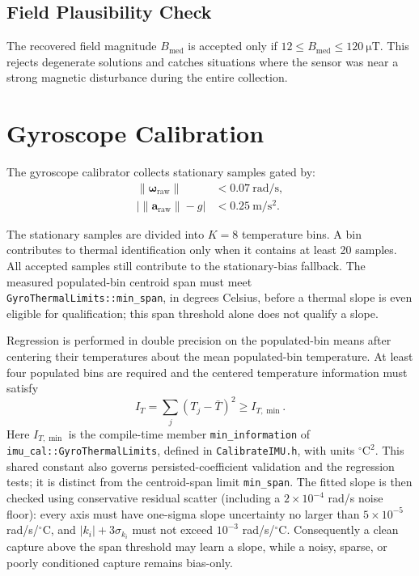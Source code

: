 \documentclass[conference]{IEEEtran}
\begin{document}
    \subsection{Field Plausibility Check}

    The recovered field magnitude $B_\text{med}$ is accepted only if
    $12 \le B_\text{med} \le \SI{120}{\micro\tesla}$.
    This rejects degenerate solutions and catches situations where
    the sensor was near a strong magnetic disturbance during the
    entire collection.

    \section{Gyroscope Calibration}
    \label{sec:gyro_fit}

    The gyroscope calibrator collects stationary samples gated by:
    \begin{align}
        \|\boldsymbol{\omega}_\text{raw}\| &< \SI{0.07}{\radian\per\second}, \\
        \bigl|\|\mathbf{a}_\text{raw}\| - g\bigr| &< \SI{0.25}{\meter\per\second\squared}.
    \end{align}

    The stationary samples are divided into $K=8$ temperature bins.  A bin
    contributes to thermal identification only when it contains at least 20
    samples.  All accepted samples still contribute to the stationary-bias
    fallback.  The measured populated-bin centroid span must meet
    \texttt{GyroThermalLimits::min\_span}, in degrees Celsius, before a
    thermal slope is even eligible for qualification; this span threshold
    alone does not qualify a slope.

    Regression is performed in double precision on the populated-bin means
    after centering their temperatures about the mean populated-bin
    temperature.  At least four populated bins are required and the centered
    temperature information must satisfy
    \begin{equation}
        I_T = \sum_j(T_j-\bar T)^2 \ge I_{T,\min}.
    \end{equation}
    Here $I_{T,\min}$ is the compile-time member \texttt{min\_information}
    of \texttt{imu\_cal::GyroThermalLimits}, defined in
    \texttt{CalibrateIMU.h}, with units ${}^\circ\mathrm{C}^2$.
    This shared constant also governs persisted-coefficient validation and
    the regression tests; it is distinct from the centroid-span limit
    \texttt{min\_span}.  The fitted slope is then checked using
    conservative residual scatter (including a $2\times10^{-4}$ rad/s noise
    floor): every axis must have one-sigma slope uncertainty no larger than
    $5\times10^{-5}$ rad/s/$^\circ$C, and
    $|k_i|+3\sigma_{k_i}$ must not exceed $10^{-3}$ rad/s/$^\circ$C.
    Consequently a clean capture above the span threshold may learn a slope,
    while a noisy, sparse, or poorly conditioned capture remains bias-only.
\end{document}
